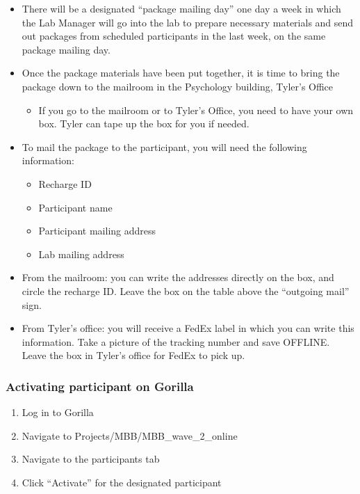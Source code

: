 \documentclass[]{book}
\providecommand{\tightlist}{%
  \setlength{\itemsep}{0pt}\setlength{\parskip}{0pt}}
\begin{document}
\begin{itemize}
\tightlist
\item
  There will be a designated ``package mailing day'' one day a week in which the Lab Manager will go into the lab to prepare necessary materials and send out packages from scheduled participants in the last week, on the same package mailing day.
\item
  Once the package materials have been put together, it is time to bring the package down to the mailroom in the Psychology building, Tyler's Office

  \begin{itemize}
  \tightlist
  \item
    If you go to the mailroom or to Tyler's Office, you need to have your own box. Tyler can tape up the box for you if needed.
  \end{itemize}
\item
  To mail the package to the participant, you will need the following information:

  \begin{itemize}
  \tightlist
  \item
    Recharge ID
  \item
    Participant name
  \item
    Participant mailing address
  \item
    Lab mailing address
  \end{itemize}
\item
  From the mailroom: you can write the addresses directly on the box, and circle the recharge ID. Leave the box on the table above the ``outgoing mail'' sign.\\
\item
  From Tyler's office: you will receive a FedEx label in which you can write this information. Take a picture of the tracking number and save OFFLINE. Leave the box in Tyler's office for FedEx to pick up.
\end{itemize}

\hypertarget{activating-participant-on-gorilla-2}{%
\subsubsection{Activating participant on Gorilla}\label{activating-participant-on-gorilla-2}}

\begin{enumerate}
\def\labelenumi{\arabic{enumi}.}
\tightlist
\item
  Log in to Gorilla
\item
  Navigate to Projects/MBB/MBB\_wave\_2\_online
\item
  Navigate to the participants tab
\item
  Click ``Activate'' for the designated participant
\end{enumerate}
\end{document}
